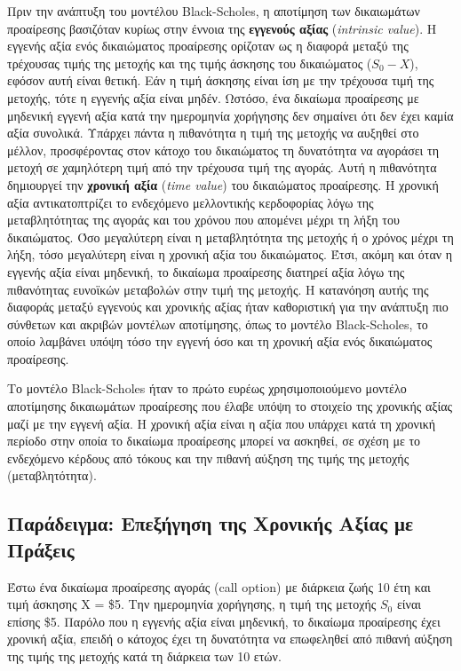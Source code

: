 Πριν την ανάπτυξη του μοντέλου Black-Scholes, η αποτίμηση των δικαιωμάτων προαίρεσης βασιζόταν κυρίως στην έννοια της \textbf{εγγενούς αξίας} (\textit{intrinsic value}).
Η εγγενής αξία ενός δικαιώματος προαίρεσης ορίζοταν ως η διαφορά μεταξύ της τρέχουσας τιμής της μετοχής και της τιμής άσκησης του δικαιώματος (\(S_0 - X\)), εφόσον αυτή είναι θετική. Εάν η τιμή άσκησης είναι ίση με την τρέχουσα τιμή της μετοχής, τότε η εγγενής αξία είναι μηδέν.
Ωστόσο, ένα δικαίωμα προαίρεσης με μηδενική εγγενή αξία κατά την ημερομηνία χορήγησης δεν σημαίνει ότι δεν έχει καμία αξία συνολικά. Υπάρχει πάντα η πιθανότητα η τιμή της μετοχής να αυξηθεί στο μέλλον, προσφέροντας στον κάτοχο του δικαιώματος τη δυνατότητα να αγοράσει τη μετοχή σε χαμηλότερη τιμή από την τρέχουσα τιμή της αγοράς. Αυτή η πιθανότητα δημιουργεί την \textbf{χρονική αξία} (\textit{time value}) του δικαιώματος προαίρεσης.
Η χρονική αξία αντικατοπτρίζει το ενδεχόμενο μελλοντικής κερδοφορίας λόγω της μεταβλητότητας της αγοράς και του χρόνου που απομένει μέχρι τη λήξη του δικαιώματος. Όσο μεγαλύτερη είναι η μεταβλητότητα της μετοχής ή ο χρόνος μέχρι τη λήξη, τόσο μεγαλύτερη είναι η χρονική αξία του δικαιώματος. Έτσι, ακόμη και όταν η εγγενής αξία είναι μηδενική, το δικαίωμα προαίρεσης διατηρεί αξία λόγω της πιθανότητας ευνοϊκών μεταβολών στην τιμή της μετοχής.
Η κατανόηση αυτής της διαφοράς μεταξύ εγγενούς και χρονικής αξίας ήταν καθοριστική για την ανάπτυξη πιο σύνθετων και ακριβών μοντέλων αποτίμησης, όπως το μοντέλο Black-Scholes, το οποίο λαμβάνει υπόψη τόσο την εγγενή όσο και τη χρονική αξία ενός δικαιώματος προαίρεσης.

Το μοντέλο Black-Scholes ήταν το πρώτο ευρέως χρησιμοποιούμενο μοντέλο αποτίμησης δικαιωμάτων προαίρεσης που έλαβε υπόψη το 
στοιχείο της χρονικής αξίας μαζί με την εγγενή αξία. Η χρονική αξία είναι η αξία που υπάρχει κατά τη χρονική περίοδο στην οποία το δικαίωμα προαίρεσης
μπορεί να ασκηθεί, σε σχέση με το ενδεχόμενο κέρδους από τόκους και την πιθανή αύξηση της τιμής της μετοχής (μεταβλητότητα).

\subsection{Παράδειγμα: Επεξήγηση της Χρονικής Αξίας με Πράξεις}

Έστω ένα δικαίωμα προαίρεσης αγοράς (call option) με διάρκεια ζωής 10 έτη και τιμή άσκησης X = \$5. Την ημερομηνία χορήγησης, η τιμή της μετοχής $S_0$ είναι επίσης \$5. 
Παρόλο που η εγγενής αξία είναι μηδενική, το δικαίωμα προαίρεσης έχει χρονική αξία, επειδή ο κάτοχος έχει τη δυνατότητα να επωφεληθεί από πιθανή αύξηση της τιμής της μετοχής
κατά τη διάρκεια των 10 ετών. 

